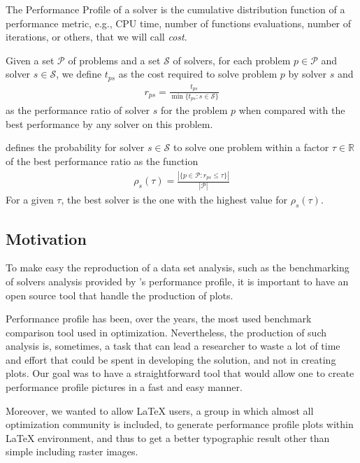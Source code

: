 \documentclass[10pt,a4paper]{article}
\def\Pset{\mathcal{P}}
\def\Sset{\mathcal{S}}
\begin{document}
The Performance Profile of a solver is the cumulative distribution
    function of a performance metric, e.g., CPU time, number of functions
    evaluations, number of iterations, or others, that we will call \emph{cost}.

    Given a set $\Pset$ of problems and a set $\Sset$ of solvers, for each problem $p
    \in \Pset$ and solver $s \in \Sset$, we define $t_{ps}$ as the cost
    required to solve problem $p$ by solver $s$ and
    \begin{align*}
      r_{ps} = \frac{t_{ps}}{\min\{t_{ps}: s \in \Sset\}}
    \end{align*}
    as the performance ratio of solver $s$ for the problem $p$ when compared
    with the best performance by any solver on this problem.

    \textcite{Dolan:2002du} defines the probability for solver $s \in \Sset$ to solve one
    problem within a factor $\tau \in \mathds{R}$ of the best performance
    ratio as the function
    \begin{align*}
      \rho_s(\tau) = \frac{| \{p \in \Pset: r_{ps} \leq \tau\} |}{| \Pset |}
    \end{align*}
     For a given $\tau$, the best solver is the one with the highest
    value for $\rho_s(\tau)$.

    \subsection*{Motivation}
    To make easy the reproduction of  a data set analysis, such as the  benchmarking of
    solvers analysis provided by \citeauthor{Dolan:2002du}'s performance profile, it is important to have an open source tool that handle the production of plots. 


    Performance profile has been, over the years, the most used benchmark comparison tool used in optimization. Nevertheless, the production of such analysis is, sometimes, a task that can lead a researcher to waste a lot of time and effort that could be spent in developing the solution, and not in creating plots. Our goal was to have a straightforward  tool that would allow one to create performance profile pictures in a fast and easy manner. 

    Moreover,  we wanted to allow LaTeX users, a group in which almost all optimization community is included,  to   generate performance profile plots  within LaTeX environment, and thus to get a better typographic result other than simple including raster  images.
\end{document}
